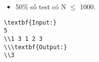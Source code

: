 \begin{itemize}
	\item     50\% số test có N  $\le$  1000.   
\end{itemize}
\begin{verbatim}
\textbf{Input:}
5
\\1 3 1 2 3
\\\textbf{Output:}
\\3\end{verbatim}